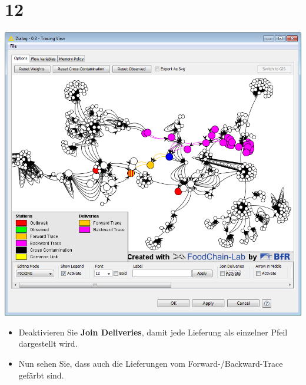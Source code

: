 \documentclass{beamer}
\begin{document}
\section{12}
\begin{frame}
	\begin{center}
  		\includegraphics[height=0.6\textheight]{12.png}
	\end{center}
	\begin{itemize}
		\item Deaktivieren Sie \textbf{Join Deliveries}, damit jede Lieferung als einzelner Pfeil dargestellt wird.
		\item Nun sehen Sie, dass auch die Lieferungen vom Forward-/Backward-Trace gefärbt sind.
	\end{itemize}
\end{frame}
\end{document}
